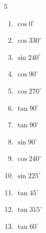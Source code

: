 \begin{multicols}{5}
\begin{enumerate}

  \item $\displaystyle \cos{0^\circ}$

        \phantom{$\displaystyle =1$}

  \item $\displaystyle \cos{330^\circ}$


  \item $\displaystyle \sin{240^\circ}$


  \item $\displaystyle \cos{90^\circ}$

        \phantom{$\displaystyle =0$}

  \item $\displaystyle \cos{270^\circ}$

        \phantom{$\displaystyle =0$}

  \item $\displaystyle \tan{90^\circ}$

        \phantom{$\displaystyle なし$}

  \item $\displaystyle \tan{90^\circ}$

        \phantom{$\displaystyle なし$}

\columnbreak %

  \item $\displaystyle \sin{90^\circ}$

        \phantom{$\displaystyle =1$}

  \item $\displaystyle \cos{240^\circ}$


  \item $\displaystyle \sin{225^\circ}$


  \item $\displaystyle \tan{45^\circ}$

        \phantom{$\displaystyle =1$}

  \item $\displaystyle \tan{315^\circ}$

        \phantom{$\displaystyle =-1$}

  \item $\displaystyle \tan{60^\circ}$


\end{enumerate}
\end{multicols}
